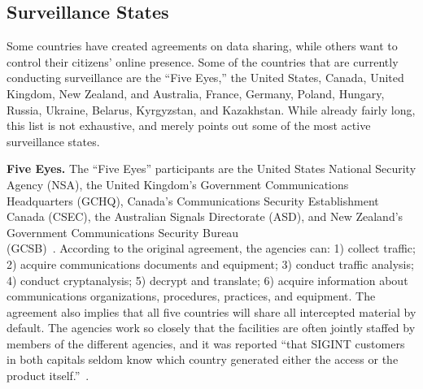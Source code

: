 \subsection{Surveillance States}

Some countries have created agreements on data sharing, while others want to control their citizens' online presence.  Some of the countries that are currently conducting surveillance are the ``Five Eyes,'' the United States, Canada, United Kingdom, New Zealand, and Australia, France, Germany, Poland, Hungary, Russia, Ukraine, Belarus, Kyrgyzstan, and Kazakhstan.  While already fairly long, this list is not exhaustive, and merely points out some of the most active surveillance states.

{\bf Five Eyes.} The ``Five Eyes'' participants are the United States National Security Agency (NSA), the United Kingdom's Government Communications Headquarters (GCHQ), Canada's Communications Security Establishment Canada (CSEC), the Australian Signals Directorate (ASD), and New Zealand's Government Communications Security Bureau \\(GCSB)~\cite{eyeswideopen}.  According to the original agreement, the agencies can: 1) collect traffic; 2) acquire communications documents and equipment; 3) conduct traffic analysis; 4) conduct cryptanalysis; 5) decrypt and translate; 6) acquire information about communications organizations, procedures, practices, and equipment.  The agreement also implies that all five countries will share all intercepted material by default.  The agencies work so closely that the facilities are often jointly staffed by members of the different agencies, and it was reported ``that SIGINT customers in both capitals seldom know which country generated either the access or the product itself.''~\cite{lander2004international}.

